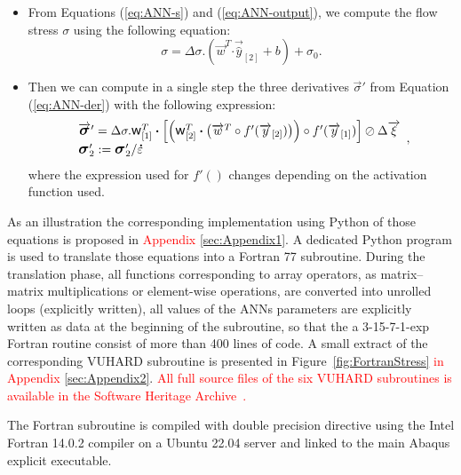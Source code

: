 \documentclass[algorithms,article,submit,pdftex,oneauthors]{Definitions/mdpi}
\DeclareRobustCommand{\w}{\mbox{\large\ensuremath{\mathsf{w}}}}
\DeclareRobustCommand{\dotp}{\boldsymbol{\cdot}}
\DeclareRobustCommand{\lay}[1]{_{[#1]}}
\DeclareRobustCommand{\mdot}[1]{\accentset{\mbox{\bfseries .}}{#1}}
\DeclareRobustCommand{\Sig}{\mbox{\large\ensuremath{\boldsymbol{\sigma}}}}
\begin{document}
\begin{itemize}
\begin{equation}
\end{equation}
\item From Equations (\ref{eq:ANN-s}) and (\ref{eq:ANN-output}), we compute the flow stress $\sigma$ using the following equation:
\begin{equation}
\sigma = \Delta\sigma.\left(\overrightarrow{w}^T \dotp \overrightarrow{\hat{y}}\lay{2} + b\right) + \sigma_{0}.\label{eq:ANNi6}
\end{equation}
\item Then we can compute in a single step the three derivatives $\overrightarrow{\sigma}'$ from Equation (\ref{eq:ANN-der}) with the following expression:
\begin{equation}
\begin{array}{l}
\overrightarrow{\Sig}' = \Delta\sigma.\w\lay{1}^T \dotp\left[\left(\w\lay{2}^T \dotp \left(\overrightarrow{w}^T \circ f'(\overrightarrow{y}\lay{2})\right)\right) \circ f'(\overrightarrow{y}\lay{1})\right] \oslash \Delta\overrightarrow{\xi}\\
\Sig_{2}' := \Sig_{2}' / \mdot{\varepsilon}
\end{array},\label{eq:ANNi7}
\end{equation}
where the expression used for $f'()$ changes depending on the activation function used.
\end{itemize}
As an illustration the corresponding implementation using Python of those equations is proposed in \textcolor{red}{Appendix \ref{sec:Appendix1}}.
A dedicated Python program is used to translate those equations into a Fortran 77 subroutine.
During the translation phase, all functions corresponding to array operators, as matrix--matrix multiplications or element-wise operations, are converted into unrolled loops (explicitly written), all values of the ANNs parameters are explicitly written as data at the beginning of the subroutine, so that the a 3-15-7-1-exp Fortran routine consist of more than 400 lines of code.
A small extract of the corresponding VUHARD subroutine is presented in Figure~\ref{fig:FortranStress} \textcolor{red}{in Appendix \ref{sec:Appendix2}}.
\textcolor{red}{All full source files of the six VUHARD subroutines is available in the Software Heritage Archive~\cite{Pantale-2023-SSF}.}

The Fortran subroutine is compiled with double precision directive using the Intel Fortran 14.0.2 compiler on a Ubuntu 22.04 server and linked to the main Abaqus explicit executable.

\end{document}
